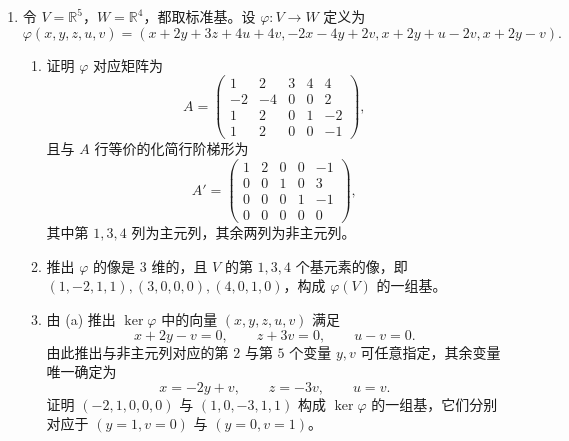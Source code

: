 \begin{enumerate}[label=\arabic*.,resume]
\begin{enumerate}[label=(\alph*)]
\item （确定线性变换的像）证明 $\varphi(V)$ 的维数为 $r$，其中 $r$ 是 $A'$ 的非零行数；并且 $\varphi(V)$ 的一组基由 $\varphi(e_{j_i})$ 给出，其中 $j_i$ 是 $A'$ 中主元列的指标。
\item （确定线性变换的核）$\ker\varphi$ 中的元素正是关于基 $e_1,\ldots,e_n$ 的坐标 $(x_1,\ldots,x_n)$ 满足方程 $AX=0$ 的向量。
\begin{enumerate}[label=(\roman*)]
\item 证明 $\varphi$ 单当且仅当 $A'$ 有 $n$ 个非零行（即秩为 $n$）。
\item 由 (i)，$\ker\varphi$ 非平凡当且仅当 $A'$ 有非主元列。证明与非主元列对应的变量可任意指定，其余变量被唯一确定，从而给出 $\ker\varphi$ 的元素。特别地，证明让一个非主元变量等于 $1$，其他非主元变量等于 $0$，并解出所有主元变量，所得向量的坐标给出 $\ker\varphi$ 的一组基。推出 $\dim\ker\varphi=n-r$，其中 $r$ 是 $A$ 的秩。
\end{enumerate}
\end{enumerate}
\item 令 $V=\mathbb R^5$，$W=\mathbb R^4$，都取标准基。设 $\varphi:V\to W$ 定义为
\[
\varphi(x,y,z,u,v)=(x+2y+3z+4u+4v,-2x-4y+2v,x+2y+u-2v,x+2y-v).
\]
\begin{enumerate}[label=(\alph*)]
\item 证明 $\varphi$ 对应矩阵为
\[
A=\begin{pmatrix}
1&2&3&4&4\\
-2&-4&0&0&2\\
1&2&0&1&-2\\
1&2&0&0&-1
\end{pmatrix},
\]
且与 $A$ 行等价的化简行阶梯形为
\[
A'=\begin{pmatrix}
1&2&0&0&-1\\
0&0&1&0&3\\
0&0&0&1&-1\\
0&0&0&0&0
\end{pmatrix},
\]
其中第 $1,3,4$ 列为主元列，其余两列为非主元列。
\item 推出 $\varphi$ 的像是 $3$ 维的，且 $V$ 的第 $1,3,4$ 个基元素的像，即 $(1,-2,1,1),(3,0,0,0),(4,0,1,0)$，构成 $\varphi(V)$ 的一组基。
\item 由 (a) 推出 $\ker\varphi$ 中的向量 $(x,y,z,u,v)$ 满足
\[
x+2y-v=0,
\qquad
z+3v=0,
\qquad
u-v=0.
\]
由此推出与非主元列对应的第 $2$ 与第 $5$ 个变量 $y,v$ 可任意指定，其余变量唯一确定为
\[
x=-2y+v,
\qquad
z=-3v,
\qquad
u=v.
\]
证明 $(-2,1,0,0,0)$ 与 $(1,0,-3,1,1)$ 构成 $\ker\varphi$ 的一组基，它们分别对应于 $(y=1,v=0)$ 与 $(y=0,v=1)$。
\end{enumerate}

\end{enumerate}
